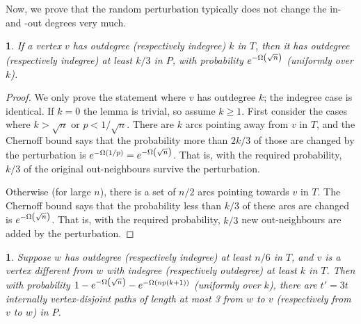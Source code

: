 \documentclass[11pt,english]{article}
\theoremstyle{plain}
\theoremstyle{definition}
\theoremstyle{definition}
\theoremstyle{plain}
\theoremstyle{plain}
\theoremstyle{plain}
\newtheorem{lem}[thm]{\protect\lemmaname}
\theoremstyle{plain}
\theoremstyle{remark}
\theoremstyle{remark}
\let\originalleft\left
\let\originalright\right
\renewcommand{\left}{\mathopen{}\mathclose\bgroup\originalleft}
\renewcommand{\right}{\aftergroup\egroup\originalright}
\providecommand{\lemmaname}{Lemma}
\begin{document}
Now, we prove that the random perturbation typically does not change the in-
and -out degrees very much.
\begin{lem}
\label{lem:preserve-degree}If a vertex $v$ has outdegree (respectively
indegree) $k$ in $T$, then it has outdegree (respectively indegree)
at least $k/3$ in $P$, with probability $e^{-\Omega\left(\sqrt{n}\right)}$ (uniformly over $k$).\end{lem}
\begin{proof}
We only prove the statement where $v$ has outdegree $k$; the indegree
case is identical. If $k=0$ the lemma is trivial, so assume $k\ge1$.
First consider the cases where $k>\sqrt{n}$ or $p<1/\sqrt{n}$. There
are $k$ arcs pointing away from $v$ in $T$, and the Chernoff bound
says that the probability more than $2k/3$ of those are changed by the
perturbation is $
e^{-\Omega\left(1/p\right)}=e^{-\Omega\left(\sqrt{n}\right)}
$. That is, with the required probability, $k/3$ of the original out-neighbours
survive the perturbation.

Otherwise (for large $n$), there is a set of $n/2$ arcs pointing
towards $v$ in $T$. The Chernoff bound says that the probability less
than $k/3$ of these arcs are changed is $e^{-\Omega\left(\sqrt{n}\right)}$.
That is, with the required probability, $k/3$ new out-neighbours
are added by the perturbation.\end{proof}
\begin{lem}
\label{lem:path-from-home}Suppose $w$ has outdegree (respectively
indegree) at least $n/6$ in $T$, and $v$ is a vertex different from $w$ with indegree
(respectively outdegree) at least $k$ in $T$. Then with probability $1-e^{-\Omega\left(\sqrt{n}\right)}-e^{-\Omega\left(np\left(k+1\right)\right)}$
(uniformly over $k$), there are $t'=3t$ internally vertex-disjoint
paths of length at most 3 from $w$ to $v$ (respectively from $v$
to $w$) in $P$.\end{lem}
\end{document}
